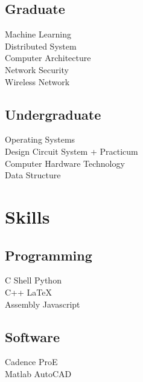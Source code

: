 \documentclass[]{deedy-resume}
\begin{document}
\begin{minipage}[t]{0.33\textwidth}
\subsection{Graduate}
Machine Learning \\
Distributed System \\
Computer Architecture \\
Network Security \\
Wireless Network \\
\sectionsep

\subsection{Undergraduate}
Operating Systems \\
Design Circuit System + Practicum\\
Computer Hardware Technology \\
Data Structure \\
\sectionsep


\section{Skills}
\subsection{Programming}
C \textbullet{} Shell \textbullet{} Python \\
C++ \textbullet{} \LaTeX\\
Assembly \textbullet{} Javascript
\sectionsep

\subsection{Software}
Cadence \textbullet{} ProE  \\
Matlab \textbullet{} AutoCAD
\sectionsep

%
%

\end{minipage}
\hfill
\end{document}

